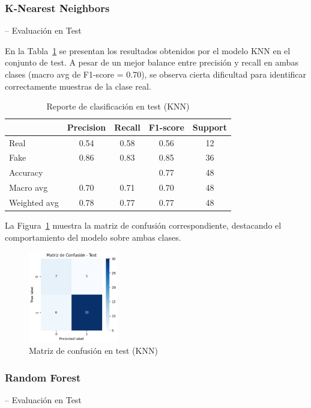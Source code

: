 \documentclass[conference]{IEEEtran}
\begin{document}
\subsubsection{K-Nearest Neighbors } -- Evaluación en Test

En la Tabla~\ref{tab:knn_test} se presentan los resultados obtenidos por el modelo KNN en el conjunto de test. 
A pesar de un mejor balance entre precisión y recall en ambas clases (macro avg de F1-score = 0.70), se observa cierta dificultad para identificar correctamente muestras de la clase real.

\begin{table}[htbp]
\centering
\caption{Reporte de clasificación en test (KNN)}
\begin{tabular}{lcccc}
\toprule
 & Precision & Recall & F1-score & Support \\
\midrule
Real & 0.54 & 0.58 & 0.56 & 12 \\
Fake & 0.86 & 0.83 & 0.85 & 36 \\
\midrule
Accuracy & & & 0.77 & 48 \\
Macro avg & 0.70 & 0.71 & 0.70 & 48 \\
Weighted avg & 0.78 & 0.77 & 0.77 & 48 \\
\bottomrule
\end{tabular}
\label{tab:knn_test}
\end{table}

\vspace{0.2cm}
La Figura~\ref{fig:cm_knn} muestra la matriz de confusión correspondiente, destacando el comportamiento del modelo sobre ambas clases.
\begin{figure}[htbp]
\centering
\includegraphics[width=0.35\textwidth]{images/cm_knn.png}
\caption{Matriz de confusión en test (KNN)}
\label{fig:cm_knn}
\end{figure}


\subsubsection{Random Forest }-- Evaluación en Test
\end{document}
